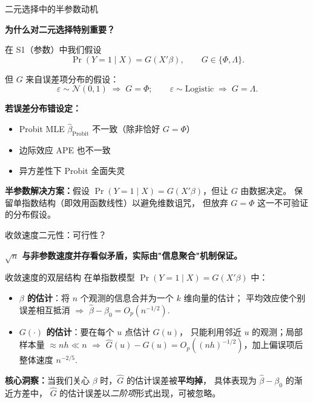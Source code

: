 \documentclass[aspectratio=169, 10pt]{beamer}
\begin{document}
\begin{frame}{二元选择中的半参数动机}

  \textbf{为什么对二元选择特别重要？}

  \vspace{0.3em}
  在 S1（参数）中我们假设
  $$\Pr(Y=1\mid X) = G(X'\beta), \qquad G \in \{\Phi, \Lambda\}.$$

  但 $G$ 来自误差项分布的假设：
  $$\varepsilon \sim \mathcal{N}(0,1) \;\Rightarrow\; G = \Phi; \qquad
  \varepsilon \sim \text{Logistic} \;\Rightarrow\; G = \Lambda.$$

  \vspace{-0.2em}
  \begin{highlightbox}
    \textbf{若误差分布错设定：}
    \begin{itemize}\setlength{\itemsep}{1pt}
      \item Probit MLE $\hat\beta_{\text{Probit}}$ 不一致（除非恰好 $G = \Phi$）
      \item 边际效应 APE 也不一致
      \item 异方差性下 Probit 全面失灵
    \end{itemize}
  \end{highlightbox}

  \begin{keybox}
    \textbf{半参数解决方案：}假设 $\Pr(Y=1\mid X) = G(X'\beta)$，但让 $G$ 由数据决定。
    保留单指数结构（即效用函数线性）以避免维数诅咒，
    但放弃 $G = \Phi$ 这一不可验证的分布假设。
  \end{keybox}

\end{frame}

\begin{frame}{收敛速度二元性：可行性？}

  \textbf{$\sqrt{n}$ 与非参数速度并存看似矛盾，实际由"信息聚合"机制保证。}

  \vspace{0.3em}
  \begin{definitionbox}{收敛速度的双层结构}
    在单指数模型 $\Pr(Y=1\mid X) = G(X'\beta)$ 中：
    \begin{itemize}\setlength{\itemsep}{2pt}
      \item \textbf{$\beta$ 的估计}：将 $n$ 个观测的信息合并为一个 $k$ 维向量的估计；
      平均效应使个别误差相互抵消 $\Rightarrow$ $\hat\beta - \beta_0 = O_p(n^{-1/2})$.
      \item \textbf{$G(\cdot)$ 的估计}：要在每个 $u$ 点估计 $G(u)$，
      只能利用邻近 $u$ 的观测；局部样本量 $\approx nh \ll n$ $\Rightarrow$
      $\hat G(u) - G(u) = O_p((nh)^{-1/2})$，加上偏误项后整体速度 $n^{-2/5}$.
    \end{itemize}
  \end{definitionbox}

  \begin{highlightbox}
    \textbf{核心洞察：}当我们关心 $\beta$ 时，$\hat G$ 的估计误差被\textbf{平均掉}，
    具体表现为 $\hat\beta - \beta_0$ 的渐近方差中，
    $\hat G$ 的估计误差以\emph{二阶项}形式出现，可被忽略。
  \end{highlightbox}

\end{frame}
\end{document}
